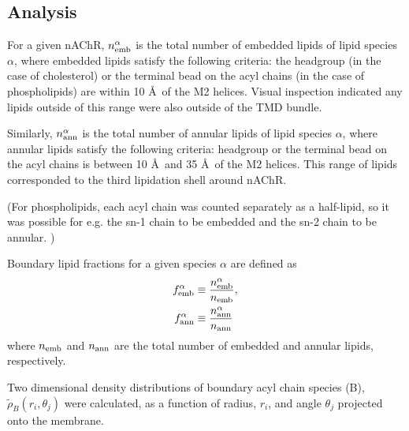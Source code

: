

\subsection{Analysis}

For a given nAChR, $n_{\mathrm{emb}}^{\alpha}$ is the total number of embedded lipids of lipid species $\alpha$, where embedded lipids satisfy the following criteria: the headgroup (in the case of cholesterol) or the terminal bead on the acyl chains (in the case of phospholipids) are within 10 {\AA}~of the M2 helices. Visual inspection indicated any lipids outside of this range were also outside of the TMD bundle.

Similarly, $n_{\mathrm{ann}}^{\alpha}$ is the total number of annular lipids of lipid species $\alpha$, where annular lipids satisfy the following criteria:  headgroup or the terminal bead on the acyl chains is between 10 {\AA}~and 35 {\AA}~of the M2 helices. This range of lipids corresponded to the third lipidation shell around nAChR.

(For phospholipids, each acyl chain was counted separately as a half-lipid, so it was possible for e.g. the sn-1 chain to be embedded and the sn-2 chain to be annular. )

Boundary lipid fractions for a given species $\alpha$ are defined as 
\begin{eqnarray}
      f_{\mathrm{emb}}^{\alpha}&\equiv \frac{  n_{\mathrm{emb}}^{\alpha} }{n_{\mathrm{emb}} },\\
      f_{\mathrm{ann}}^{\alpha}&\equiv \frac{n_{\mathrm{ann}}^{\alpha}}{n_{\mathrm{ann}}}
    \label{eq:f}
  \end{eqnarray}
where $n_{\mathrm{emb}}$ and $n_{\mathrm{ann}}$ are the total number of embedded and annular lipids, respectively.  

Two dimensional density distributions of boundary acyl chain species (B), $\tilde{\rho}_{B}(r_i,\theta_j)$ were calculated, as a function of radius, $r_i$, and angle $\theta_j$ projected onto the membrane.

